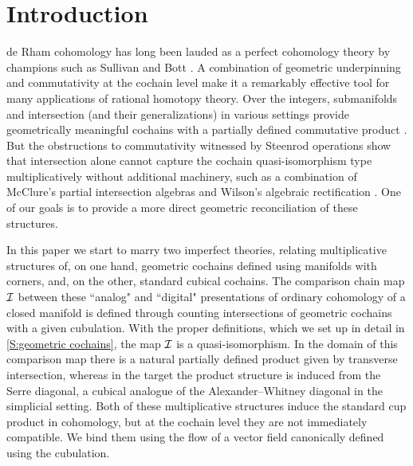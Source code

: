 
\section{Introduction}\label{S:intro}

de Rham cohomology has long been lauded as a perfect cohomology theory by champions such as Sullivan \cite{sullivan1977infinitesimal} and Bott \cite{BoTu82}.
A combination of geometric underpinning and commutativity at the cochain level make it a remarkably effective tool for many applications of rational homotopy theory.
Over the integers, submanifolds and intersection (and their generalizations) in various settings provide geometrically meaningful cochains \cite{Lipy14} with a partially defined commutative product \cite{Joyc15, medina2022foundations}.
But the obstructions to commutativity witnessed by Steenrod operations show that intersection alone cannot capture the cochain quasi-isomorphism type multiplicatively without additional machinery, such as a combination of McClure’s partial intersection algebras \cite{McCl06} and Wilson’s algebraic rectification \cite{Wils10}. One of our goals is to provide a more direct geometric reconciliation of these structures.

In this paper we start to marry two imperfect theories, relating multiplicative structures of, on one hand, geometric cochains defined using manifolds with corners, and, on the other, standard cubical cochains.
The comparison chain map $\mathcal{I}$ between these ``analog" and ``digital" presentations of ordinary cohomology of a closed manifold is defined through counting intersections of geometric cochains with a given cubulation. With the proper definitions, which we set up in detail in \cref{S:geometric cochains}, the map $\mathcal{I}$ is a quasi-isomorphism.
In the domain of this comparison map there is a natural partially defined product given by transverse intersection, whereas in the target the product structure is induced from the Serre diagonal, a cubical analogue of the Alexander--Whitney diagonal in the simplicial setting.
Both of these multiplicative structures induce the standard cup product in cohomology, but at the cochain level they are not immediately compatible.
We bind them using the flow of a vector field canonically defined using the cubulation.


